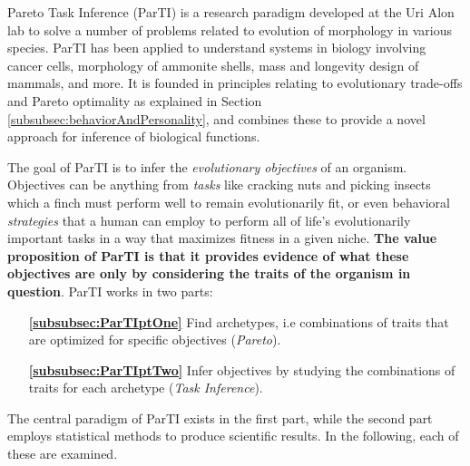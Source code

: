 Pareto Task Inference (ParTI) is a research paradigm developed at the Uri Alon lab to solve a number of problems related to evolution of morphology in various species. ParTI has been applied to understand systems in biology involving cancer cells, morphology of ammonite shells, mass and longevity design of mammals, and more. It is founded in principles relating to evolutionary trade-offs and Pareto optimality as explained in Section \ref{subsubsec:behaviorAndPersonality}, and combines these to provide a novel approach for inference of biological functions.

The goal of ParTI is to infer the \textit{evolutionary objectives} of an organism. Objectives can be anything from \textit{tasks} like cracking nuts and picking insects which a finch must perform well to remain evolutionarily fit, or even behavioral \textit{strategies} that a human can employ to perform all of life's evolutionarily important tasks in a way that maximizes fitness in a given niche. \textbf{The value proposition of ParTI is that it provides evidence of what these objectives are only by considering the traits of the organism in question}. ParTI works in two parts:
\begin{itemize}[leftmargin=.55in]
	\item [\textbf{\ref{subsubsec:ParTIptOne}}] Find archetypes, i.e combinations of traits that are optimized for specific objectives (\textit{Pareto}).
	\item [\textbf{\ref{subsubsec:ParTIptTwo}}] Infer objectives by studying the combinations of traits for each archetype (\textit{Task Inference}).
\end{itemize}

The central paradigm of ParTI exists in the first part, while the second part employs statistical methods to produce scientific results. In the following, each of these are examined.